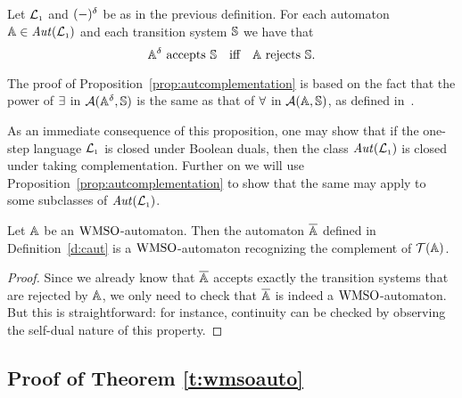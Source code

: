 \begin{proposition}
\label{prop:autcomplementation}
Let $\mathcal{L}_{\scriptscriptstyle 1}$ and $(-)^{\delta}$ be as in the previous definition.
For each automaton $\mathbb{A} \in \mathit{Aut}(\mathcal{L}_{\scriptscriptstyle 1})$ and each transition system
$\mathbb{S}$ we have that
\[
\dual{\aut} \text{ accepts } \model
\quad\text{iff}\quad
\aut \text{ rejects } \model.
\]
\end{proposition}

The proof of Proposition~\ref{prop:autcomplementation} is based on the fact
that the power of $\exists$ in $\mathcal{A}(\mathbb{A}^{\delta},\mathbb{S})$ is the same
as that of $\forall$ in $\mathcal{A}(\mathbb{A},\mathbb{S})$, as defined in~\cite{DBLP:conf/calco/KissigV09}.

As an immediate consequence of this proposition, one may show that if the
one-step language $\mathcal{L}_{\scriptscriptstyle 1}$ is closed under Boolean duals, then the class
$\mathit{Aut}(\mathcal{L}_{\scriptscriptstyle 1})$ is closed under taking complementation.
Further on we will use Proposition~\ref{prop:autcomplementation} to show that
the same may apply to some subclasses of $\mathit{Aut}(\mathcal{L}_{\scriptscriptstyle 1})$.


\begin{theorem}
\label{t:cl-cmp}
Let $\mathbb{A}$ be an $\mathrm{WMSO}$-automaton.
Then the automaton $\overline{\mathbb{A}}$ defined in Definition~\ref{d:caut} is a
$\mathrm{WMSO}$-automaton recognizing the complement of $\mathcal{T}(\mathbb{A})$.
\end{theorem}

\begin{proof}
Since we already know that $\overline{\mathbb{A}}$ accepts exactly the transition
systems that are rejected by $\mathbb{A}$, we only need to check that 
$\overline{\mathbb{A}}$ is indeed a $\mathrm{WMSO}$-automaton.
But this is straightforward: for instance, continuity can be checked by 
observing the self-dual nature of this property.
\end{proof}



\subsection{Proof of Theorem \ref{t:wmsoauto}}

